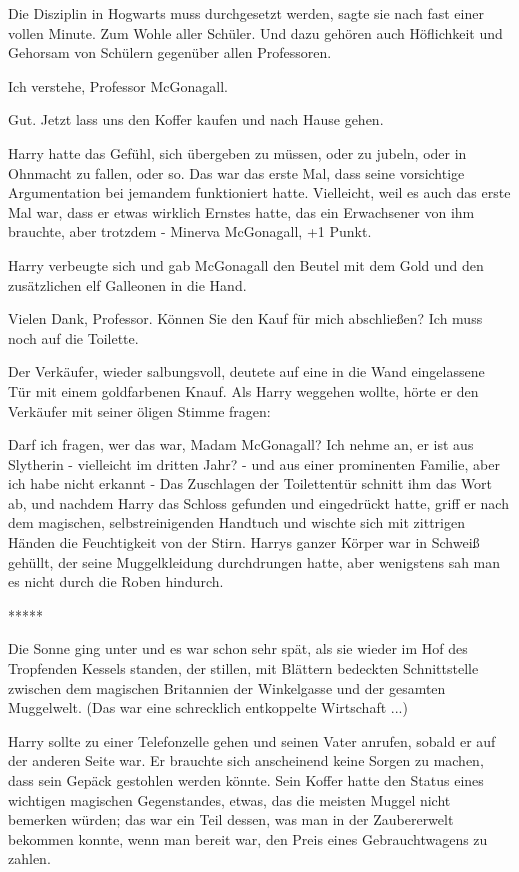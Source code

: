 \glqq{}Die Disziplin in Hogwarts muss durchgesetzt werden\grqq{}, sagte sie nach
fast einer vollen Minute. \glqq{}Zum Wohle aller Schüler. Und dazu gehören auch
Höflichkeit und Gehorsam von Schülern gegenüber allen Professoren.\grqq{}

\glqq{}Ich verstehe, Professor McGonagall.\grqq{}

\glqq{}Gut. Jetzt lass uns den Koffer kaufen und nach Hause gehen.\grqq{}

Harry hatte das Gefühl, sich übergeben zu müssen, oder zu jubeln, oder in
Ohnmacht zu fallen, oder so. Das war das erste Mal, dass seine vorsichtige
Argumentation bei jemandem funktioniert hatte. Vielleicht, weil es auch das
erste Mal war, dass er etwas wirklich Ernstes hatte, das ein Erwachsener von ihm
brauchte, aber trotzdem - Minerva McGonagall, +1 Punkt.

Harry verbeugte sich und gab McGonagall den Beutel mit dem Gold und den
zusätzlichen elf Galleonen in die Hand.

\glqq{}Vielen Dank, Professor. Können Sie den Kauf für mich abschließen? Ich
muss noch auf die Toilette.\grqq{}

Der Verkäufer, wieder salbungsvoll, deutete auf eine in die Wand eingelassene
Tür mit einem goldfarbenen Knauf. Als Harry weggehen wollte, hörte er den
Verkäufer mit seiner öligen Stimme fragen:

\glqq{}Darf ich fragen, wer das war, Madam McGonagall? Ich nehme an, er ist aus
Slytherin - vielleicht im dritten Jahr? - und aus einer prominenten Familie,
aber ich habe nicht erkannt -\grqq{} Das Zuschlagen der Toilettentür schnitt ihm
das Wort ab, und nachdem Harry das Schloss gefunden und eingedrückt hatte, griff
er nach dem magischen, selbstreinigenden Handtuch und wischte sich mit zittrigen
Händen die Feuchtigkeit von der Stirn. Harrys ganzer Körper war in Schweiß
gehüllt, der seine Muggelkleidung durchdrungen hatte, aber wenigstens sah man es
nicht durch die Roben hindurch.

\begin{center}*****\end{center}

Die Sonne ging unter und es war schon sehr spät, als sie wieder im Hof des
Tropfenden Kessels standen, der stillen, mit Blättern bedeckten Schnittstelle
zwischen dem magischen Britannien der Winkelgasse und der gesamten Muggelwelt.
(Das war eine schrecklich entkoppelte Wirtschaft ...)

Harry sollte zu einer Telefonzelle gehen und seinen Vater anrufen, sobald er auf
der anderen Seite war. Er brauchte sich anscheinend keine Sorgen zu machen, dass
sein Gepäck gestohlen werden könnte. Sein Koffer hatte den Status eines
wichtigen magischen Gegenstandes, etwas, das die meisten Muggel nicht bemerken
würden; das war ein Teil dessen, was man in der Zaubererwelt bekommen konnte,
wenn man bereit war, den Preis eines Gebrauchtwagens zu zahlen.

